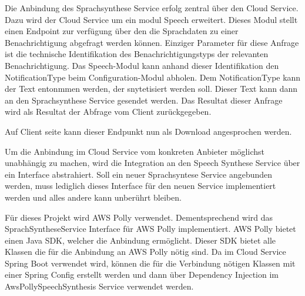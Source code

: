 Die Anbindung des Sprachsynthese Service erfolg zentral über den Cloud Service.
Dazu wird der Cloud Service um ein modul Speech erweitert.
Dieses Modul stellt einen Endpoint zur verfügung über den die Sprachdaten zu einer Benachrichtigung abgefragt werden können.
Einziger Parameter für diese Anfrage ist die technische Identifikation des Benachrichtigungstyps der relevanten Benachrichtigung.
Das Speech-Modul kann anhand dieser Identifikation den NotificationType beim Configuration-Modul abholen.
Dem NotificationType kann der Text entonmmen werden, der snytetisiert werden soll.
Dieser Text kann dann an den Sprachsynthese Service gesendet werden.
Das Resultat dieser Anfrage wird als Resultat der Abfrage vom Client zurückgegeben.



Auf Client seite kann dieser Endpunkt nun als Download angesprochen werden.



Um die Anbindung im Cloud Service vom konkreten Anbieter möglichst unabhängig zu machen, wird die Integration an den Speech Synthese Service über ein Interface abstrahiert.
Soll ein neuer Sprachsyntese Service angebunden werden, muss lediglich dieses Interface für den neuen Service implementiert werden und alles andere kann unberührt bleiben.

\clearpage



Für dieses Projekt wird AWS Polly verwendet.
Dementsprechend wird das SprachSyntheseService Interface für AWS Polly implementiert.
AWS Polly bietet einen Java SDK, welcher die Anbindung ermöglicht.
Dieser SDK bietet alle Klassen die für die Anbindung an AWS Polly nötig sind.
Da im Cloud Service Spring Boot verwendet wird, können die für die Verbindung nötigen Klassen mit einer Spring Config erstellt werden
und dann über Dependency Injection im AwsPollySpeechSynthesis Service verwendet werden.



